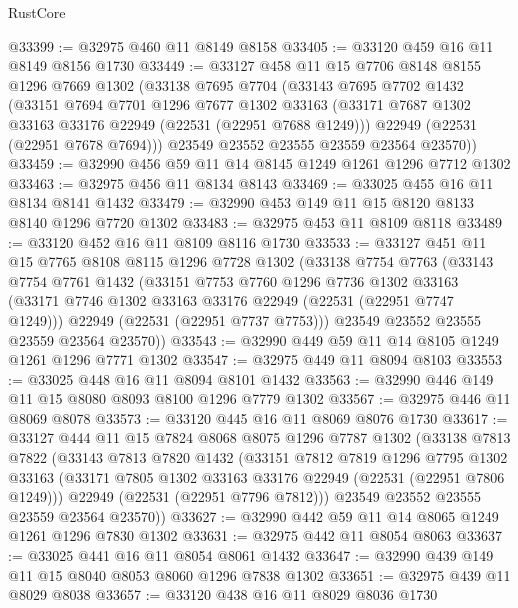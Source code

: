 \begin{lexlean}{RustCore}
\begin{coremodule}
@33399 := @32975 @460 @11 @8149 @8158
@33405 := @33120 @459 @16 @11 @8149 @8156 @1730
@33449 := @33127
    @458
    @11
    @15
    @7706
    @8148
    @8155
    @1296
    @7669
    @1302
    (@33138
      @7695
      @7704
      (@33143
        @7695
        @7702
        @1432
        (@33151
          @7694
          @7701
          @1296
          @7677
          @1302
          @33163
          (@33171 @7687 @1302 @33163 @33176 @22949 (@22531 (@22951 @7688 @1249)))
          @22949
          (@22531 (@22951 @7678 @7694)))
        @23549
        @23552
        @23555
        @23559
        @23564
        @23570))
@33459 := @32990 @456 @59 @11 @14 @8145 @1249 @1261 @1296 @7712 @1302
@33463 := @32975 @456 @11 @8134 @8143
@33469 := @33025 @455 @16 @11 @8134 @8141 @1432
@33479 := @32990 @453 @149 @11 @15 @8120 @8133 @8140 @1296 @7720 @1302
@33483 := @32975 @453 @11 @8109 @8118
@33489 := @33120 @452 @16 @11 @8109 @8116 @1730
@33533 := @33127
    @451
    @11
    @15
    @7765
    @8108
    @8115
    @1296
    @7728
    @1302
    (@33138
      @7754
      @7763
      (@33143
        @7754
        @7761
        @1432
        (@33151
          @7753
          @7760
          @1296
          @7736
          @1302
          @33163
          (@33171 @7746 @1302 @33163 @33176 @22949 (@22531 (@22951 @7747 @1249)))
          @22949
          (@22531 (@22951 @7737 @7753)))
        @23549
        @23552
        @23555
        @23559
        @23564
        @23570))
@33543 := @32990 @449 @59 @11 @14 @8105 @1249 @1261 @1296 @7771 @1302
@33547 := @32975 @449 @11 @8094 @8103
@33553 := @33025 @448 @16 @11 @8094 @8101 @1432
@33563 := @32990 @446 @149 @11 @15 @8080 @8093 @8100 @1296 @7779 @1302
@33567 := @32975 @446 @11 @8069 @8078
@33573 := @33120 @445 @16 @11 @8069 @8076 @1730
@33617 := @33127
    @444
    @11
    @15
    @7824
    @8068
    @8075
    @1296
    @7787
    @1302
    (@33138
      @7813
      @7822
      (@33143
        @7813
        @7820
        @1432
        (@33151
          @7812
          @7819
          @1296
          @7795
          @1302
          @33163
          (@33171 @7805 @1302 @33163 @33176 @22949 (@22531 (@22951 @7806 @1249)))
          @22949
          (@22531 (@22951 @7796 @7812)))
        @23549
        @23552
        @23555
        @23559
        @23564
        @23570))
@33627 := @32990 @442 @59 @11 @14 @8065 @1249 @1261 @1296 @7830 @1302
@33631 := @32975 @442 @11 @8054 @8063
@33637 := @33025 @441 @16 @11 @8054 @8061 @1432
@33647 := @32990 @439 @149 @11 @15 @8040 @8053 @8060 @1296 @7838 @1302
@33651 := @32975 @439 @11 @8029 @8038
@33657 := @33120 @438 @16 @11 @8029 @8036 @1730

\end{coremodule}
\end{lexlean}
